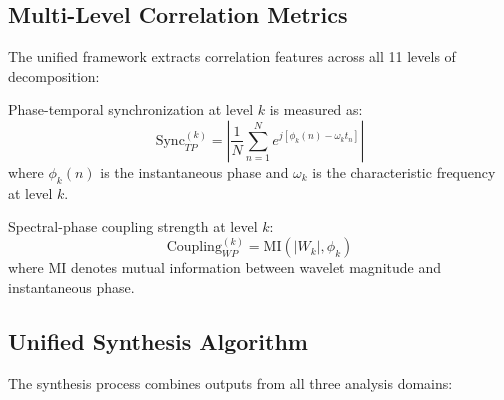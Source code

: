 \subsection{Multi-Level Correlation Metrics}

The unified framework extracts correlation features across all 11 levels of decomposition:


\begin{definition}
Phase-temporal synchronization at level $k$ is measured as:
\begin{equation}
\text{Sync}_{TP}^{(k)} = \left|\frac{1}{N}\sum_{n=1}^{N} e^{j[\phi_k(n) - \omega_k t_n]}\right|
\end{equation}
where $\phi_k(n)$ is the instantaneous phase and $\omega_k$ is the characteristic frequency at level $k$.
\end{definition}

\begin{definition}
Spectral-phase coupling strength at level $k$:
\begin{equation}
\text{Coupling}_{WP}^{(k)} = \text{MI}(|W_k|, \phi_k)
\end{equation}
where $\text{MI}$ denotes mutual information between wavelet magnitude and instantaneous phase.
\end{definition}

\subsection{Unified Synthesis Algorithm}

The synthesis process combines outputs from all three analysis domains:

